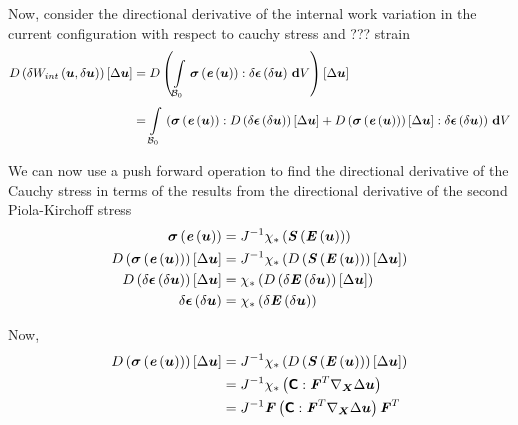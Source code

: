 Now, consider the directional derivative of the internal work variation in the current
configuration \ie with respect to cauchy stress and ??? strain
\begin{equation}
  \begin{split}
       D\left( \delta W_{int}\left( \boldsymbol{u},\delta\boldsymbol{u} \right)  \right) \left[ \Delta\boldsymbol{u} \right]  &=
       D\left(   \displaystyle\int\limits_{ \mathcal{B} _{0}}^{} \, \boldsymbol{\mathit{\sigma}}\left( 
             \boldsymbol{\mathit{e}}\left( \boldsymbol{u} \right)  \right) :\delta \boldsymbol{\mathit{\epsilon}}\left( \delta\boldsymbol{u} \right) \, \boldsymbol{\mathrm{d}}  V  \right) \left[ \Delta\boldsymbol{u} \right]  \\
    &=  \displaystyle\int\limits_{ \mathcal{B} _{0}}^{} \,\left(  \boldsymbol{\mathit{\sigma}}\left( 
           \boldsymbol{\mathit{e}}\left( \boldsymbol{u} \right)  \right) :   D\left( \delta \boldsymbol{\mathit{\epsilon}}\left( \delta\boldsymbol{u} \right)  \right) \left[ \Delta\boldsymbol{u} \right]  +
         D\left(  \boldsymbol{\mathit{\sigma}}\left( 
             \boldsymbol{\mathit{e}}\left( \boldsymbol{u} \right)  \right)  \right) \left[ \Delta\boldsymbol{u} \right]  :\delta \boldsymbol{\mathit{\epsilon}}\left( \delta\boldsymbol{u} \right)  \right)\, \boldsymbol{\mathrm{d}}  V 
  \end{split}
\end{equation}

We can now use a push forward operation to find the directional derivative of the
Cauchy stress in terms of the results from the directional derivative of the second
Piola-Kirchoff stress \ie
\begin{equation}
  \begin{split}
     \boldsymbol{\mathit{\sigma}}\left(  \boldsymbol{\mathit{e}}\left( \boldsymbol{u} \right)  \right) &=
    {J}^{-1} \chi_{*}\left(  \boldsymbol{\mathit{S}}\left(  \boldsymbol{\mathit{E}}\left( \boldsymbol{u} \right)  \right)  \right) \\
       D\left(  \boldsymbol{\mathit{\sigma}}\left(  \boldsymbol{\mathit{e}}\left( \boldsymbol{u} \right)  \right)  \right) \left[ \Delta\boldsymbol{u} \right]  &=
    {J}^{-1} \chi_{*}\left(    D\left(  \boldsymbol{\mathit{S}}\left(  \boldsymbol{\mathit{E}}\left( \boldsymbol{u} \right)  \right)  \right) \left[ \Delta\boldsymbol{u} \right]   \right) \\
       D\left( \delta \boldsymbol{\mathit{\epsilon}}\left( \delta\boldsymbol{u} \right)  \right) \left[ \Delta\boldsymbol{u} \right]  &=
     \chi_{*}\left(    D\left( \delta \boldsymbol{\mathit{E}}\left( \delta\boldsymbol{u} \right)  \right) \left[ \Delta\boldsymbol{u} \right]   \right) \\
    \delta \boldsymbol{\mathit{\epsilon}}\left( \delta\boldsymbol{u} \right) &= \chi_{*}\left( \delta \boldsymbol{\mathit{E}}\left( \delta\boldsymbol{u} \right)  \right) 
  \end{split}
\end{equation}

Now,
\begin{equation}
  \begin{split}
    \directionalderiv{\fnof{\tensor{\sigma}}{\fnof{\tensor{e}}{\vectr{u}}}}{\Delta\vectr{u}}&=
    \inverse{J}\pushforward{\chi}{\pbrac{\directionalderiv{\fnof{\tensor{S}}{\fnof{\tensor{E}}{\vectr{u}}}}{\Delta\vectr{u}}}}\\
    &=\inverse{J}\pushforward{\chi}{\pbrac{\doubledotprod{\tensorfour{C}}{\transpose{\tensortwo{F}}\gradient{\vectr{X}}{\Delta\vectr{u}}}}}\\
    &=\inverse{J}\tensor{F}\pbrac{\doubledotprod{\tensorfour{C}}{\transpose{\tensortwo{F}}\gradient{\vectr{X}}{\Delta\vectr{u}}}}\transpose{\tensor{F}}
  \end{split}
\end{equation}

